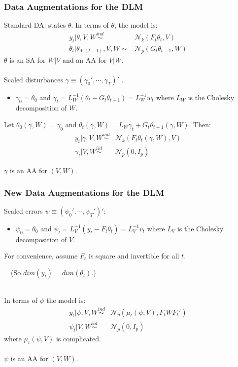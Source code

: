 \documentclass[xcolor=dvipsnames]{beamer}
\newcommand\N{\mathcal{N}}
\begin{document}
\begin{frame}
\frametitle{Data Augmentations for the DLM}
Standard DA: states $\theta$. In terms of $\theta$, the model is:
\begin{align*}
y_t|\theta,V,W \stackrel{ind}{\sim} & \N_k(F_t\theta_t,V)\\ 
\theta_t|\theta_{0:(t-1)},V,W \sim & \N_p(G_t\theta_{t-1},W)
\end{align*} 
{\color{blue}$\theta$ is an SA for $W|V$ and an AA for $V|W$.}\\~\\

Scaled disturbances $\gamma\equiv(\gamma_0',\cdots,\gamma_T)'$ \citep{fruhwirth2004efficient}.
\begin{itemize}
\item[]$\gamma_0=\theta_0$ and $\gamma_t=L_W^{-1}(\theta_t - G_t\theta_{t-1})=L_W^{-1}w_t$ where $L_W$ is the Cholesky decomposition of $W$.
\end{itemize}
Let $\theta_0(\gamma,W)=\gamma_0$ and $\theta_t(\gamma,W)=L_W\gamma_t + G_t\theta_{t-1}(\gamma,W)$. Then:
\begin{align*}
y_t|\gamma,V,W \stackrel{ind}{\sim} & \N_k(F_t\theta_t(\gamma,W),V) \\
\gamma_t|V,W \stackrel{iid}{\sim} & \N_p(0,I_p)
\end{align*} 

{\color{blue}$\gamma$ is an AA for $(V,W)$.}

\end{frame}

\begin{frame}
\frametitle{New Data Augmentations for the DLM}
Scaled errors $\psi\equiv(\psi_0',\cdots,\psi_T')'$:
\begin{itemize}
\item[]$\psi_0=\theta_0$ and $\psi_t=L_V^{-1}(y_t - F_t\theta_t)=L_V^{-1}v_t$ where $L_V$ is the Cholesky decomposition of $V$.
\end{itemize}
For convenience, assume $F_t$ is square and invertible for all $t$.
 
\ \ (So $dim(y_t)=dim(\theta_t)$.)\\~

In terms of $\psi$ the model is:
\begin{align*}
y_t|\psi,V,W \stackrel{ind}{\sim} &\N_p(\mu_t(\psi,V),F_tWF_t')\\
\psi_t|V,W \stackrel{iid}{\sim} &\N_p(0,I_p)
\end{align*} 
where $\mu_t(\psi,V)$ is complicated.\\~\\

{\color{blue}$\psi$ is an AA for $(V,W)$.}
\end{frame}
\end{document}
